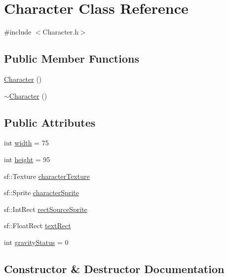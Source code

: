 \hypertarget{class_character}{}\section{Character Class Reference}
\label{class_character}


{\ttfamily \#include $<$Character.\+h$>$}

\subsection*{Public Member Functions}
\begin{DoxyCompactItemize}
\item 
\hyperlink{class_character_adc27bdd255876169bad2ed0bae0cffb5}{Character} ()
\item 
\hyperlink{class_character_a9e9be564d05ded80962b2045aa70b3fc}{$\sim$\+Character} ()
\end{DoxyCompactItemize}
\subsection*{Public Attributes}
\begin{DoxyCompactItemize}
\item 
int \hyperlink{class_character_aa945d94f4ee6ec02e5cf1fb753c94d8f}{width} = 75
\item 
int \hyperlink{class_character_a1f7e996c91a75a5e037bebcf0bf3ac06}{height} = 95
\item 
sf\+::\+Texture \hyperlink{class_character_a3880f38149ee17393273212aba865a5e}{character\+Texture}
\item 
sf\+::\+Sprite \hyperlink{class_character_af726b53a176ba8032e3a0ad28a11868c}{character\+Sprite}
\item 
sf\+::\+Int\+Rect \hyperlink{class_character_a8461b99479fbc94d4b001b61f49bcafe}{rect\+Source\+Sprite}
\item 
sf\+::\+Float\+Rect \hyperlink{class_character_ab0ce752b24dd3ac9252be132b046c917}{text\+Rect}
\item 
int \hyperlink{class_character_a40b71119c7b457c7fec3a90a012da631}{gravity\+Status} = 0
\end{DoxyCompactItemize}


\subsection{Constructor \& Destructor Documentation}
\mbox{\label{class_character_adc27bdd255876169bad2ed0bae0cffb5}} 
